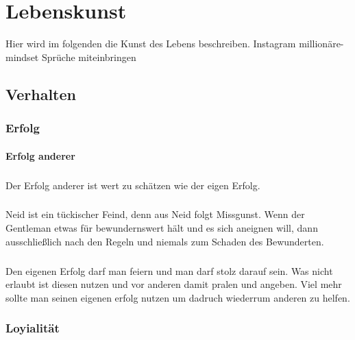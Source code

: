 \chapter{Lebenskunst} 
    \begin{thesis_quotation}

    \end{thesis_quotation}
    
    Hier wird im folgenden die Kunst des Lebens beschreiben. 
    {\color{red}Instagram millionäre-mindset Sprüche miteinbringen }
    
    \section{Verhalten}
        \subsection{Erfolg}
            \subsubsection{Erfolg anderer}
                \paragraph{} Der Erfolg anderer ist wert zu schätzen wie der eigen Erfolg.
                \paragraph{} Neid ist ein tückischer Feind, denn aus Neid folgt Missgunst. Wenn der Gentleman etwas für bewundernswert hält und es sich aneignen will, dann ausschließlich
                nach den Regeln und niemals zum Schaden des Bewunderten.
            \subsubsection{}
                \paragraph{} Den eigenen Erfolg darf man feiern und man darf stolz darauf sein. Was nicht erlaubt ist diesen nutzen und vor anderen damit pralen und angeben. Viel mehr sollte man seinen eigenen erfolg nutzen um dadruch wiederrum anderen zu helfen.
        \subsection{Loyialität}
